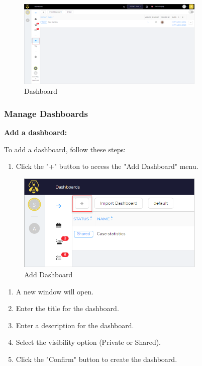\documentclass{article}
\begin{document}
\begin{figure}[H]
    \centering
    \includegraphics[width=0.8\textwidth]{dashboard1.png}
    \caption{Dashboard}
    \label{fig:dashboard}
\end{figure}

\subsubsection*{Manage Dashboards}

\textbf{Add a dashboard:}

To add a dashboard, follow these steps:

\begin{enumerate}
  \item Click the "+" button to access the "Add Dashboard" menu.
\end{enumerate}

\begin{figure}[H]
    \centering
    \includegraphics[width=0.8\textwidth]{dashboard2.png}
    \caption{Add Dashboard}
    \label{fig:adddashboard}
\end{figure}

\begin{enumerate}
  \item A new window will open.
  \item Enter the title for the dashboard.
  \item Enter a description for the dashboard.
  \item Select the visibility option (Private or Shared).
  \item Click the "Confirm" button to create the dashboard.
\end{enumerate}
\end{document}
